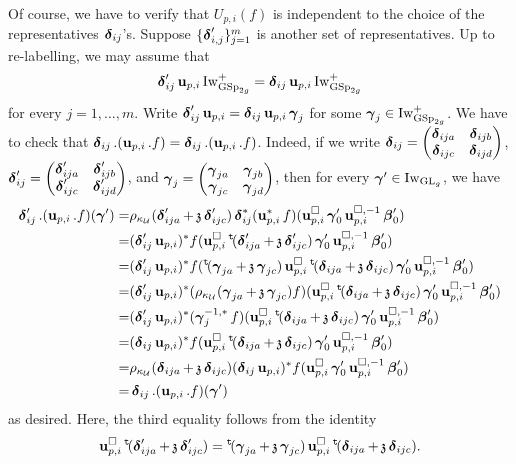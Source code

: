 Of course, we have to verify that $U_{p,i}(f)$ is independent to the choice of the representatives $\bfdelta_{ij}$'s. Suppose $\{\bfdelta'_{i,j}\}_{j=1}^m$ is another set of representatives. Up to re-labelling, we may assume that
$$\bfdelta'_{ij}\bfu_{p,i}\Iw^+_{\GSp_{2g}}=\bfdelta_{ij}\bfu_{p,i}\Iw^+_{\GSp_{2g}}$$
for every $j=1,\ldots, m$. Write $\bfdelta'_{ij}\bfu_{p,i}=\bfdelta_{ij}\bfu_{p,i}\bfgamma_j$ for some $\bfgamma_j\in \Iw^+_{\GSp_{2g}}$. We have to check that $\bfdelta_{ij}.(\bfu_{p,i}.f)=\bfdelta_{ij}.(\bfu_{p,i}.f)$. Indeed, if we write $\bfdelta_{ij}=\begin{pmatrix}\bfdelta_{ija}& \bfdelta_{ijb}\\ \bfdelta_{ijc}& \bfdelta_{ijd}\end{pmatrix}$, $\bfdelta'_{ij}=\begin{pmatrix}\bfdelta'_{ija}& \bfdelta'_{ijb}\\ \bfdelta'_{ijc}& \bfdelta'_{ijd}\end{pmatrix}$, and $\bfgamma_{j}=\begin{pmatrix}\bfgamma_{ja}& \bfgamma_{jb}\\ \bfgamma_{jc}& \bfgamma_{jd}\end{pmatrix}$, then for every $\bfgamma'\in \Iw_{\GL_g}$, we have
\begin{align*}
\bfdelta'_{ij}.(\bfu_{p,i}.f)(\bfgamma')
=&\rho_{\kappa_{\calU}}(\bfdelta'_{ija}+\frakz\bfdelta'_{ijc})\bfdelta_{ij}^*(\bfu_{p,i}^*f)(\bfu_{p,i}^{\square}\bfgamma'_0\bfu_{p,i}^{\square,-1}\bfbeta'_0)\\
=& (\bfdelta'_{ij}\bfu_{p,i})^*f(\bfu_{p,i}^{\square}\trans(\bfdelta'_{ija}+\frakz\bfdelta'_{ijc})\bfgamma'_0\bfu_{p,i}^{\square,-1}\bfbeta'_0)\\
=&(\bfdelta'_{ij}\bfu_{p,i})^*f(\trans(\bfgamma_{ja}+\frakz\bfgamma_{jc})\bfu_{p,i}^{\square}\trans(\bfdelta_{ija}+\frakz\bfdelta_{ijc})\bfgamma'_0\bfu_{p,i}^{\square,-1}\bfbeta'_0)\\
=&(\bfdelta'_{ij}\bfu_{p,i})^*(\rho_{\kappa_{\calU}}(\bfgamma_{ja}+\frakz\bfgamma_{jc})f)(\bfu_{p,i}^{\square}\trans(\bfdelta_{ija}+\frakz\bfdelta_{ijc})\bfgamma'_0\bfu_{p,i}^{\square,-1}\bfbeta'_0)\\
=&(\bfdelta'_{ij}\bfu_{p,i})^*(\bfgamma_j^{-1, *}f)(\bfu_{p,i}^{\square}\trans(\bfdelta_{ija}+\frakz\bfdelta_{ijc})\bfgamma'_0\bfu_{p,i}^{\square,-1}\bfbeta'_0)\\
=&(\bfdelta_{ij}\bfu_{p,i})^*f(\bfu_{p,i}^{\square}\trans(\bfdelta_{ija}+\frakz\bfdelta_{ijc})\bfgamma'_0\bfu_{p,i}^{\square,-1}\bfbeta'_0)\\
=&\rho_{\kappa_{\calU}}(\bfdelta_{ija}+\frakz\bfdelta_{ijc})(\bfdelta_{ij}\bfu_{p,i})^*f(\bfu_{p,i}^{\square}\bfgamma'_0\bfu_{p,i}^{\square,-1}\bfbeta'_0)\\
=&\bfdelta_{ij}.(\bfu_{p,i}.f)(\bfgamma')
\end{align*}
as desired. Here, the third equality follows from the identity
$$\bfu_{p,i}^{\square}\trans(\bfdelta'_{ija}+\frakz\bfdelta'_{ijc})=\trans(\bfgamma_{ja}+\frakz\bfgamma_{jc})\bfu_{p,i}^{\square}\trans(\bfdelta_{ija}+\frakz\bfdelta_{ijc}).$$

